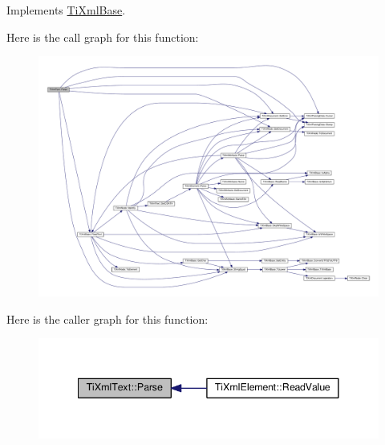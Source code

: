 Implements \hyperlink{class_ti_xml_base_a00e4edb0219d00a1379c856e5a1d2025}{Ti\+Xml\+Base}.



Here is the call graph for this function\+:
\nopagebreak
\begin{figure}[H]
\begin{center}
\leavevmode
\includegraphics[width=350pt]{class_ti_xml_text_a8d2dcfa41fc73d3e62dacc2fcf633819_cgraph}
\end{center}
\end{figure}




Here is the caller graph for this function\+:
\nopagebreak
\begin{figure}[H]
\begin{center}
\leavevmode
\includegraphics[width=341pt]{class_ti_xml_text_a8d2dcfa41fc73d3e62dacc2fcf633819_icgraph}
\end{center}
\end{figure}


